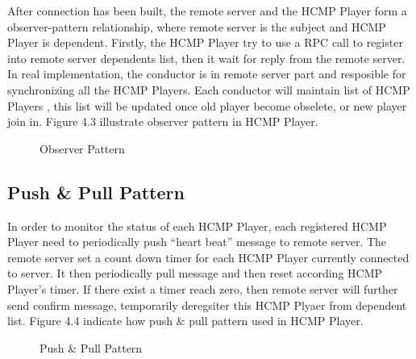 After connection has been built, the remote server and the HCMP Player form a 
observer-pattern relationship, where remote server is the subject and HCMP Player 
is dependent. Firstly, the HCMP Player try to use a RPC call to register into 
remote server dependents list, then it wait for reply from the remote server. In real 
implementation, the conductor is in remote server part and resposible
for synchronizing all the HCMP Players. Each conductor will maintain list of HCMP Players
, this list will be updated once old player become obselete, or new player join in.
Figure 4.3 illustrate observer pattern in HCMP Player.  
\begin{figure}[H]
\caption{Observer Pattern}
\label{fig:speciation}
\end{figure}

\subsection{Push \& Pull Pattern}
In order to monitor the status of each HCMP Player, each registered HCMP Player 
need to periodically push ``heart beat'' message to remote server. 
The remote server set a count down timer for each HCMP Player currently 
connected to server. It  
then periodically pull message and then reset according HCMP Player's timer. 
If there exist a timer reach 
zero, then remote server will further send confirm message, temporarily deregsiter 
this HCMP Plyaer from dependent list. Figure 4.4 indicate how push \& pull pattern 
used in HCMP Player.

\begin{figure}[H]
\caption{Push \& Pull Pattern}
\label{fig:speciation}
\end{figure}

